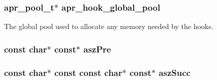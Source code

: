 \subsubsection[{\texorpdfstring{apr\+\_\+hook\+\_\+global\+\_\+pool}{apr_hook_global_pool}}]{ {\bf apr\+\_\+pool\+\_\+t}$\ast$ apr\+\_\+hook\+\_\+global\+\_\+pool}\hypertarget{group__APR__Util__Hook_gabef8cf5f8a4528192b0aa66200b09ccc}{}\label{group__APR__Util__Hook_gabef8cf5f8a4528192b0aa66200b09ccc}
The global pool used to allocate any memory needed by the hooks. 
\subsubsection[{\texorpdfstring{asz\+Pre}{aszPre}}]{\setlength{\rightskip}{0pt plus 5cm}const char$\ast$ const$\ast$ asz\+Pre}\hypertarget{group__APR__Util__Hook_ga8daee2cc4d5ba6e3b82b2f45cc2920a1}{}\label{group__APR__Util__Hook_ga8daee2cc4d5ba6e3b82b2f45cc2920a1}
\subsubsection[{\texorpdfstring{asz\+Succ}{aszSucc}}]{\setlength{\rightskip}{0pt plus 5cm}const char$\ast$ const const char$\ast$ const$\ast$ asz\+Succ}\hypertarget{group__APR__Util__Hook_ga4dedfeea57daba4a4579d174e94e5afc}{}\label{group__APR__Util__Hook_ga4dedfeea57daba4a4579d174e94e5afc}
